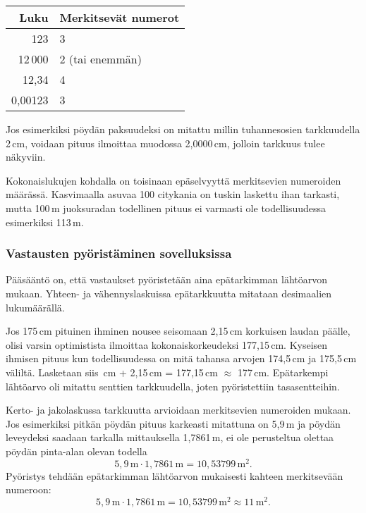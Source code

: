 \begin{center}
\begin{tabular}{r|l}
Luku & Merkitsevät numerot \\
\hline
123 & 3 \\
12\,000 & 2 (tai enemmän)\\
12,34 & 4 \\
0,00123 & 3
\end{tabular}
\end{center}

Jos esimerkiksi pöydän paksuudeksi on mitattu millin tuhannesosien tarkkuudella 2\,cm, voidaan pituus ilmoittaa muodossa 2,0000\,cm, jolloin tarkkuus tulee näkyviin.


Kokonaislukujen kohdalla on toisinaan epäselvyyttä merkitsevien numeroiden määrässä. Kasvimaalla asuvaa 100 citykania on tuskin laskettu ihan tarkasti, mutta 100\,m juoksuradan todellinen pituus ei varmasti ole todellisuudessa esimerkiksi 113\,m.

\subsubsection*{Vastausten pyöristäminen sovelluksissa}

Pääsääntö on, että vastaukset pyöristetään aina epätarkimman lähtöarvon mukaan. Yhteen- ja vähennyslaskuissa epätarkkuutta mitataan desimaalien lukumäärällä.

\begin{esimerkki} Jos 175\,cm pituinen ihminen nousee seisomaan 2,15\,cm korkuisen laudan päälle, olisi varsin optimistista ilmoittaa kokonaiskorkeudeksi 177,15\,cm. Kyseisen ihmisen pituus kun todellisuudessa on mitä tahansa arvojen
174,5\,cm ja 175,5\,cm väliltä. Lasketaan siis \,cm + 2,15\,cm = 177,15\,cm $\approx$ 177\,cm. 
Epätarkempi lähtöarvo oli mitattu senttien tarkkuudella, joten pyöristettiin tasasentteihin.
\end{esimerkki}

Kerto- ja jakolaskussa tarkkuutta arvioidaan merkitsevien numeroiden mukaan. Jos esimerkiksi pitkän pöydän pituus karkeasti mitattuna on 5,9\,m ja pöydän leveydeksi saadaan tarkalla mittauksella 1,7861\,m, ei ole perusteltua olettaa pöydän pinta-alan olevan todella
\[ 5,9\,\textrm{m} \cdot 1,7861\,\textrm{m} = 10,53799\,\textrm{m}^2. \] 
Pyöristys tehdään epätarkimman lähtöarvon mukaisesti kahteen merkitsevään numeroon:
\[ 5,9\,\textrm{m} \cdot 1,7861\,\textrm{m} = 10,53799\,\textrm{m}^2 \approx 11\,\textrm{m}^2.\] 

